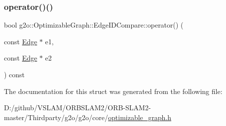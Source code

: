 \subsubsection{\texorpdfstring{operator()()}{operator()()}}
{\footnotesize\ttfamily bool g2o\+::\+Optimizable\+Graph\+::\+Edge\+I\+D\+Compare\+::operator() (\begin{DoxyParamCaption}\item[{const \mbox{\hyperlink{classg2o_1_1_optimizable_graph_1_1_edge}{Edge}} $\ast$}]{e1,  }\item[{const \mbox{\hyperlink{classg2o_1_1_optimizable_graph_1_1_edge}{Edge}} $\ast$}]{e2 }\end{DoxyParamCaption}) const\hspace{0.3cm}{\ttfamily [inline]}}



The documentation for this struct was generated from the following file\+:\begin{DoxyCompactItemize}
\item 
D\+:/github/\+V\+S\+L\+A\+M/\+O\+R\+B\+S\+L\+A\+M2/\+O\+R\+B-\/\+S\+L\+A\+M2-\/master/\+Thirdparty/g2o/g2o/core/\mbox{\hyperlink{optimizable__graph_8h}{optimizable\+\_\+graph.\+h}}\end{DoxyCompactItemize}
